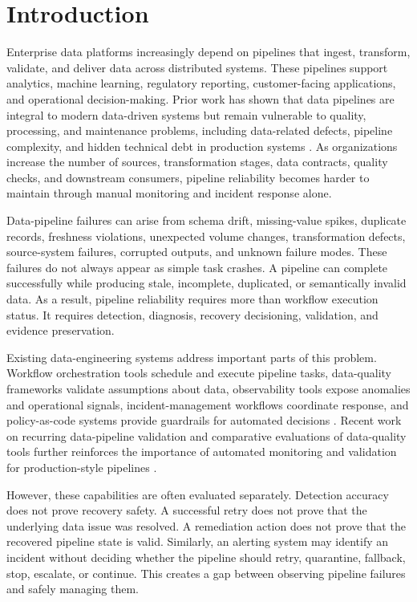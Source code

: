 \section{Introduction}
\label{sec:introduction}

Enterprise data platforms increasingly depend on pipelines that ingest, transform, validate, and deliver data across distributed systems. These pipelines support analytics, machine learning, regulatory reporting, customer-facing applications, and operational decision-making. Prior work has shown that data pipelines are integral to modern data-driven systems but remain vulnerable to quality, processing, and maintenance problems, including data-related defects, pipeline complexity, and hidden technical debt in production systems \cite{foidl2023pipelinequality,sculley2015hidden,xin2021production}. As organizations increase the number of sources, transformation stages, data contracts, quality checks, and downstream consumers, pipeline reliability becomes harder to maintain through manual monitoring and incident response alone.

Data-pipeline failures can arise from schema drift, missing-value spikes, duplicate records, freshness violations, unexpected volume changes, transformation defects, source-system failures, corrupted outputs, and unknown failure modes. These failures do not always appear as simple task crashes. A pipeline can complete successfully while producing stale, incomplete, duplicated, or semantically invalid data. As a result, pipeline reliability requires more than workflow execution status. It requires detection, diagnosis, recovery decisioning, validation, and evidence preservation.

Existing data-engineering systems address important parts of this problem. Workflow orchestration tools schedule and execute pipeline tasks, data-quality frameworks validate assumptions about data, observability tools expose anomalies and operational signals, incident-management workflows coordinate response, and policy-as-code systems provide guardrails for automated decisions \cite{apacheairflowdags2026,greatexpectations2026,dbt2026datatests,opa2026docs,googlesre2026monitoring}. Recent work on recurring data-pipeline validation and comparative evaluations of data-quality tools further reinforces the importance of automated monitoring and validation for production-style pipelines \cite{tu2023autovalidate,rehberger2026dqtools}.

However, these capabilities are often evaluated separately. Detection accuracy does not prove recovery safety. A successful retry does not prove that the underlying data issue was resolved. A remediation action does not prove that the recovered pipeline state is valid. Similarly, an alerting system may identify an incident without deciding whether the pipeline should retry, quarantine, fallback, stop, escalate, or continue. This creates a gap between observing pipeline failures and safely managing them.

